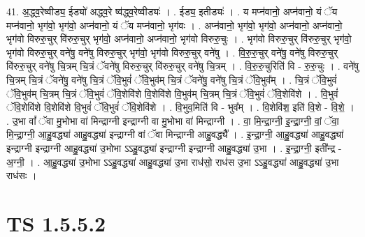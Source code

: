 \documentclass[17pt]{extarticle}
\begin{document}
41. अ॒द्ध्व॒रेष्वीड्य॒ ईड्यो॑ अद्ध्व॒रे ष्व॑द्ध्व॒रेष्वीड्यः॑ । . ईड्य॒ इतीड्यः॑ । . य मप्न॑वानो॒ अप्न॑वानो॒ यं ॅय मप्न॑वानो॒ भृग॑वो॒ भृग॑वो॒ अप्न॑वानो॒ यं ॅय मप्न॑वानो॒ भृग॑वः । . अप्न॑वानो॒ भृग॑वो॒ भृग॑वो॒ अप्न॑वानो॒ अप्न॑वानो॒ भृग॑वो विरुरु॒चुर् वि॑रुरु॒चुर् भृग॑वो॒ अप्न॑वानो॒ अप्न॑वानो॒ भृग॑वो विरुरु॒चुः । . भृग॑वो विरुरु॒चुर् वि॑रुरु॒चुर् भृग॑वो॒ भृग॑वो विरुरु॒चुर् वने॑षु॒ वने॑षु विरुरु॒चुर् भृग॑वो॒ भृग॑वो विरुरु॒चुर् वने॑षु । . वि॒रु॒रु॒चुर् वने॑षु॒ वने॑षु विरुरु॒चुर् वि॑रुरु॒चुर् वने॑षु चि॒त्रम् चि॒त्रं ॅवने॑षु विरुरु॒चुर् वि॑रुरु॒चुर् वने॑षु चि॒त्रम् । . वि॒रु॒रु॒चुरिति॑ वि - रु॒रु॒चुः । . वने॑षु चि॒त्रम् चि॒त्रं ॅवने॑षु॒ वने॑षु चि॒त्रं ॅवि॒भुवं॑ ॅवि॒भुव॑म् चि॒त्रं ॅवने॑षु॒ वने॑षु चि॒त्रं ॅवि॒भुव᳚म् । . चि॒त्रं ॅवि॒भुवं॑ ॅवि॒भुव॑म् चि॒त्रम् चि॒त्रं ॅवि॒भुवं॑ ॅवि॒शेवि॑शे वि॒शेवि॑शे वि॒भुव॑म् चि॒त्रम् चि॒त्रं ॅवि॒भुवं॑ ॅवि॒शेवि॑शे । . वि॒भुवं॑ ॅवि॒शेवि॑शे वि॒शेवि॑शे वि॒भुवं॑ ॅवि॒भुवं॑ ॅवि॒शेवि॑शे । . वि॒भुव॒मिति॑ वि - भुव᳚म् । . वि॒शेवि॑श॒ इति॑ वि॒शे - वि॒शे॒ । . उ॒भा वां᳚ ॅवा मु॒भोभा वा॑ मिन्द्राग्नी इन्द्राग्नी वा मु॒भोभा वा॑ मिन्द्राग्नी । . वा॒ मि॒न्द्रा॒ग्नी॒ इ॒न्द्रा॒ग्नी॒ वां॒ ॅवा॒ मि॒न्द्रा॒ग्नी॒ आ॒हु॒वद्ध्या॑ आहु॒वद्ध्या॑ इन्द्राग्नी वां ॅवा मिन्द्राग्नी आहु॒वद्ध्यै᳚ । . इ॒न्द्रा॒ग्नी॒ आ॒हु॒वद्ध्या॑ आहु॒वद्ध्या॑ इन्द्राग्नी इन्द्राग्नी आहु॒वद्ध्या॑ उ॒भोभा ऽऽहु॒वद्ध्या॑ इन्द्राग्नी इन्द्राग्नी आहु॒वद्ध्या॑ उ॒भा । . इ॒न्द्रा॒ग्नी॒ इती᳚न्द्र - अ॒ग्नी॒ । . आ॒हु॒वद्ध्या॑ उ॒भोभा ऽऽहु॒वद्ध्या॑ आहु॒वद्ध्या॑ उ॒भा राध॑सो॒ राध॑स उ॒भा ऽऽहु॒वद्ध्या॑ आहु॒वद्ध्या॑ उ॒भा राध॑सः । \newline
\pagebreak
{}
\section*{ TS 1.5.5.2 }
\end{document}
